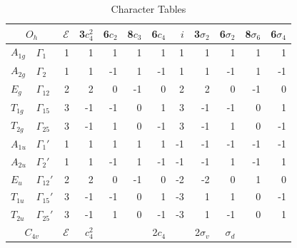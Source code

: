 \documentclass[twocolumn,showpacs,preprintnumbers,superscriptaddress,prb,floatfix,aps,10pt]{revtex4-1}
\newcommand*{\id}{\mathcal{E}}
\begin{document}
%
\begin{table}
\caption{\label{table:chartab} Character Tables}
\begin{ruledtabular}
\begin{tabular*}{10cm}{llrrrrrrrrrr}
\multicolumn{2}{c}{$O_h$}         &$\id$&3$c_4^2$& 6$c_2$ & 8$c_3$ & 6$c_4$ &  $i$ & 3$\sigma_2$ & 6$\sigma_2$ & 8$\sigma_6$ & 6$\sigma_4$ \\  
\hline
$A_{1g}$        & $\Gamma_{1}  $  &  1  &     1  &     1  &     1  &     1  &   1  &          1  &          1  &          1  &          1  \\         %
$A_{2g}$        & $\Gamma_{2}  $  &  1  &     1  &    -1  &     1  &    -1  &   1  &          1  &         -1  &          1  &         -1  \\         %
$E_g   $        & $\Gamma_{12} $  &  2  &     2  &     0  &    -1  &     0  &   2  &          2  &          0  &         -1  &          0  \\         %
$T_{1g}$        & $\Gamma_{15} $  &  3  &    -1  &    -1  &     0  &     1  &   3  &         -1  &         -1  &          0  &          1  \\         %
$T_{2g}$        & $\Gamma_{25} $  &  3  &    -1  &     1  &     0  &    -1  &   3  &         -1  &          1  &          0  &         -1  \\         %
$A_{1u}$        & $\Gamma_{1} '$  &  1  &     1  &     1  &     1  &     1  &  -1  &         -1  &         -1  &         -1  &         -1  \\         %
$A_{2u}$        & $\Gamma_{2} '$  &  1  &     1  &    -1  &     1  &    -1  &  -1  &         -1  &          1  &         -1  &          1  \\         %
$E_u   $        & $\Gamma_{12}'$  &  2  &     2  &     0  &    -1  &     0  &  -2  &         -2  &          0  &          1  &          0  \\         %
$T_{1u}$        & $\Gamma_{15}'$  &  3  &    -1  &    -1  &     0  &     1  &  -3  &          1  &          1  &          0  &         -1  \\         %
$T_{2u}$        & $\Gamma_{25}'$  &  3  &    -1  &     1  &     0  &    -1  &  -3  &          1  &         -1  &          0  &          1  \\ \hline \hline %
\multicolumn{2}{c}{$C_{4v}$}      &$\id$& $c_4^2$&        &        & 2$c_4$ &      & 2$\sigma_v$ &  $\sigma_d$ &             &             \\ 

\end{tabular*}
\end{ruledtabular}
\end{table}
\end{document}
